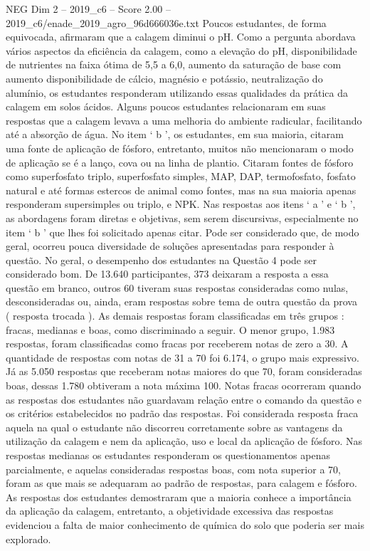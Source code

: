 \begin{textsample}{NEG Dim 2 – 2019\_c6 – Score 2.00 – 2019\_c6/enade\_2019\_agro\_96d666036e.txt}
Poucos estudantes, de forma equivocada, afirmaram que a calagem diminui o pH.
Como a pergunta abordava vários aspectos da eficiência da calagem, como a elevação do pH, disponibilidade de nutrientes na faixa ótima de 5,5 a 6,0, aumento da saturação de base com aumento disponibilidade de cálcio, magnésio e potássio, neutralização do alumínio, os estudantes responderam utilizando essas qualidades da prática da calagem em solos ácidos.
Alguns poucos estudantes relacionaram em suas respostas que a calagem levava a uma melhoria do ambiente radicular, facilitando até a absorção de água.
No item ‘ b ’, os estudantes, em sua maioria, citaram uma fonte de aplicação de fósforo, entretanto, muitos não mencionaram o modo de aplicação se é a lanço, cova ou na linha de plantio.
Citaram fontes de fósforo como superfosfato triplo, superfosfato simples, MAP, DAP, termofosfato, fosfato natural e até formas estercos de animal como fontes, mas na sua maioria apenas responderam supersimples ou triplo, e NPK.
Nas respostas aos itens ‘ a ’ e ‘ b ’, as abordagens foram diretas e objetivas, sem serem discursivas, especialmente no item ‘ b ’ que lhes foi solicitado apenas citar.
Pode ser considerado que, de modo geral, ocorreu pouca diversidade de soluções apresentadas para responder à questão.
No geral, o desempenho dos estudantes na Questão 4 pode ser considerado bom.
De 13.640 participantes, 373 deixaram a resposta a essa questão em branco, outros 60 tiveram suas respostas consideradas como nulas, desconsideradas ou, ainda, eram respostas sobre tema de outra questão da prova ( resposta trocada ).
As demais respostas foram classificadas em três grupos : fracas, medianas e boas, como discriminado a seguir.
O menor grupo, 1.983 respostas, foram classificadas como fracas por receberem notas de zero a 30.
A quantidade de respostas com notas de 31 a 70 foi 6.174, o grupo mais expressivo.
Já as 5.050 respostas que receberam notas maiores do que 70, foram consideradas boas, dessas 1.780 obtiveram a nota máxima 100.
Notas fracas ocorreram quando as respostas dos estudantes não guardavam relação entre o comando da questão e os critérios estabelecidos no padrão das respostas.
Foi considerada resposta fraca aquela na qual o estudante não discorreu corretamente sobre as vantagens da utilização da calagem e nem da aplicação, uso e local da aplicação de fósforo.
Nas respostas medianas os estudantes responderam os questionamentos apenas parcialmente, e aquelas consideradas respostas boas, com nota superior a 70, foram as que mais se adequaram ao padrão de respostas, para calagem e fósforo.
As respostas dos estudantes demostraram que a maioria conhece a importância da aplicação da calagem, entretanto, a objetividade excessiva das respostas evidenciou a falta de maior conhecimento de química do solo que poderia ser mais explorado.

\end{textsample}
